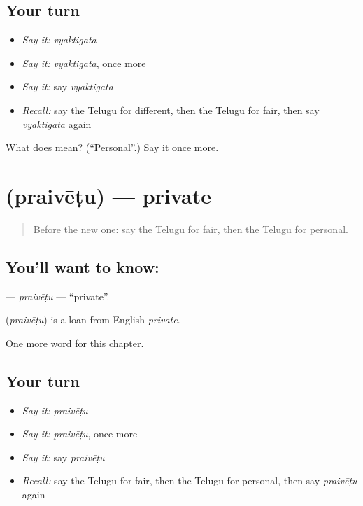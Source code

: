 \subsection*{Your turn}
\begin{itemize}
\raggedright
  \item \emph{Say it:} \emph{vyaktigata}
  \item \emph{Say it:} \emph{vyaktigata}, once more
  \item \emph{Say it:} say \emph{vyaktigata}
  \item \emph{Recall:} say the Telugu for different, then the Telugu for fair, then say \emph{vyaktigata} again
\end{itemize}

\begin{tcolorbox}[breakable,colback=teal!4,colframe=teal!35!black,title={Before you move on}]
What does  mean? (\textquotedblleft{}Personal\textquotedblright{}.) Say it once more.
\end{tcolorbox}
\section[\texorpdfstring{\te{ప్రైవేటు} (praivēṭu)}{ప్రైవేటు (praivēṭu)}]{ (praivēṭu) — private}

\label{lesson:TE-C223-praivetu}



\begin{quote}
Before the new one: say the Telugu for fair, then the Telugu for personal.
\end{quote}

\subsection*{You'll want to know: }
\textbf{} — \emph{praivēṭu} — \textquotedblleft{}private\textquotedblright{}.

\begin{cousinweb}
\textbf{} (\emph{praivēṭu}) is a loan from English \emph{private}.
\end{cousinweb}

\begin{grammarlens}[title={What you've built}]
One more word for this chapter.
\end{grammarlens}

\subsection*{Your turn}
\begin{itemize}
\raggedright
  \item \emph{Say it:} \emph{praivēṭu}
  \item \emph{Say it:} \emph{praivēṭu}, once more
  \item \emph{Say it:} say \emph{praivēṭu}
  \item \emph{Recall:} say the Telugu for fair, then the Telugu for personal, then say \emph{praivēṭu} again
\end{itemize}

